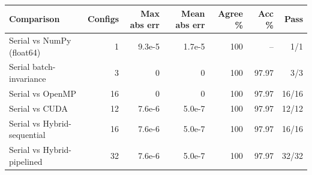 \begin{tabular}{lrrrrrr}
\toprule
Comparison & Configs & Max abs err & Mean abs err & Agree \% & Acc \% & Pass \\
\midrule
Serial vs NumPy (float64) & 1 & 9.3e-5 & 1.7e-5 & 100 & -- & 1/1 \\
Serial batch-invariance & 3 & 0 & 0 & 100 & 97.97 & 3/3 \\
Serial vs OpenMP & 16 & 0 & 0 & 100 & 97.97 & 16/16 \\
Serial vs CUDA & 12 & 7.6e-6 & 5.0e-7 & 100 & 97.97 & 12/12 \\
Serial vs Hybrid-sequential & 16 & 7.6e-6 & 5.0e-7 & 100 & 97.97 & 16/16 \\
Serial vs Hybrid-pipelined & 32 & 7.6e-6 & 5.0e-7 & 100 & 97.97 & 32/32 \\
\bottomrule
\end{tabular}
